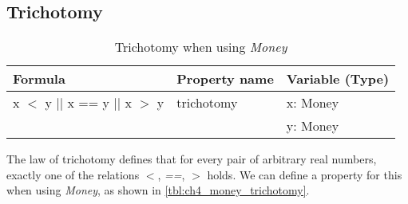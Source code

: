 \subsection*{Trichotomy}
\label{ssct:properties_trichotomy}
\FloatBarrier
\begin{table}[!ht]
\centering
\begin{tabular}{lll}
\hline
                        \textbf{Formula}             & \textbf{Property name} & \textbf{Variable (Type)} \\ \hline
\rowcolor[HTML]{EFEFEF} x $<$ y $||$ x == y $||$ x $>$ y & trichotomy             & x: Money                 \\
\rowcolor[HTML]{EFEFEF}                              &                        & y: Money                 \\ \hline
\end{tabular}
\caption{Trichotomy when using \textit{Money}}
\label{tbl:ch4_money_trichotomy}
\end{table}
\FloatBarrier
The law of trichotomy defines that for every pair of arbitrary real numbers,
exactly one of the relations \textit{$<$}, \textit{==}, \textit{$>$} holds. We
can define a property for this when using \textit{Money}, as shown in
\autoref{tbl:ch4_money_trichotomy}.

